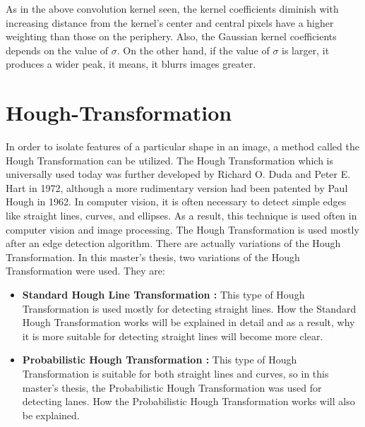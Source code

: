 As in the above convolution kernel seen, the kernel coefficients diminish with increasing distance from the kernel's center and central pixels have a higher weighting than those on the periphery. Also, the Gaussian kernel coefficients depends on the value of $\sigma$. On the other hand, if the value of $\sigma$ is larger, it produces a wider peak, it means, it blurrs images greater.





















\section{Hough-Transformation}\label{sec:Hough-Transformation}
%
In order to isolate features of a particular shape in an image, a method called the Hough Transformation can be utilized. The Hough Transformation which is universally used today was further developed by Richard O. Duda and Peter E. Hart in 1972, although a more rudimentary version had been patented by Paul Hough in 1962.\cite{Hough_Transformation} In computer vision, it is often necessary to detect simple edges like straight lines, curves, and ellipses. As a result, this technique is used often in computer vision and image processing. The Hough Transformation is used mostly after an edge detection algorithm. There are actually variations of the Hough Transformation. In this master's thesis, two variations of the Hough Transformation were used. They are:

\begin{itemize}

\item \textbf{Standard Hough Line Transformation : }This type of Hough Transformation is used mostly for detecting straight lines. How the Standard Hough Transformation works will be explained in detail and as a result, why it is more suitable for detecting straight lines will become more clear.

\item \textbf{Probabilistic Hough Transformation : }This type of Hough Transformation is suitable for both straight lines and curves, so in this master's thesis, the Probabilistic Hough Transformation was used for detecting lanes. How the Probabilistic Hough Transformation works will also be explained.

\end{itemize}
%
